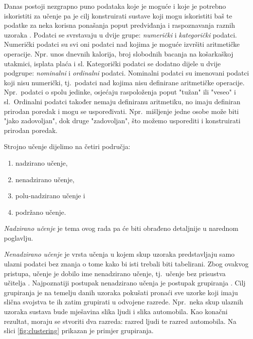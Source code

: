\documentclass[times, utf8, zavrsni]{fer}
\begin{document}
Danas postoji nezgrapno puno podataka koje je moguće i koje je potrebno iskoristiti za učenje pa je cilj konstruirati sustave koji mogu iskoristiti baš te podatke za neka korisna ponašanja poput predviđanja i raspoznavanja raznih uzoraka \citep{cupicML}. Podatci se svrstavaju u dvije grupe: \textit{numerički} i \textit{kategorički} podatci. Numerički podatci su svi oni podatci nad kojima je moguće izvršiti aritmetičke operacije. Npr. unos dnevnih kalorija, broj slobodnih bacanja na košarkaškoj utakmici, isplata plaća i sl. Kategorički podatci se dodatno dijele u dvije podgrupe: \textit{nominalni} i \textit{ordinalni} podatci. Nominalni podatci su imenovani podatci koji nisu numerički, tj.\ podatci nad kojima nisu definirane aritmetičke operacije. Npr.\ podatci o spolu jedinke, osjećaju raspoloženja poput "tužan" ili "veseo" i sl.\ Ordinalni podatci također nemaju definiranu aritmetiku, no imaju definiran prirodan poredak i mogu se uspoređivati. Npr.\ mišljenje jedne osobe može biti "jako zadovoljan", dok druge "zadovoljan", što možemo usporediti i konstruirati prirodan poredak.

Strojno učenje dijelimo na četiri područja:
\begin{center}
    \begin{enumerate}
        \item nadzirano učenje,
        \item nenadzirano učenje,
        \item polu-nadzirano učenje i
        \item podržano učenje.
    \end{enumerate}
\end{center}

\textit{Nadzirano učenje} je tema ovog rada pa će biti obrađeno detaljnije u narednom poglavlju.

\bigskip

\textit{Nenadzirano učenje}  je vrsta učenja u kojem skup uzoraka predstavljaju samo ulazni podatci bez znanja o tome kako bi isti trebali biti tabelirani. Zbog ovakvog pristupa, učenje je dobilo ime nenadzirano učenje, tj.\ učenje bez prisustva učitelja . Najpoznatiji postupak nenadzirano učenja je postupak grupiranja . Cilj grupiranja je na temelju danih uzoraka pokušati pronaći sve uzorke koji imaju slična svojstva te ih zatim grupirati u odvojene razrede. Npr.\ neka skup ulaznih uzoraka sustava bude mješavina slika ljudi i slika automobila. Kao konačni rezultat, moraju se stvoriti dva razreda: razred ljudi te razred automobila. Na slici \ref{fig:clustering} prikazan je primjer grupiranja.
\end{document}
